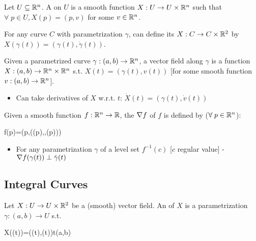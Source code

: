 \documentclass[13pt]{extarticle}
\begin{document}
\newp
\begin{tcolorbox}[colback=white]
    \begin{definition}
        Let $U\subseteq\mathbb{R}^n$. A  on $U$ is a smooth function $X:U\to U\times\mathbb{R}^n$ such that $\forall\;p\in U,X(p)=(p,v)$ for some $v\in\mathbb{R}^n$.
    \end{definition}
\end{tcolorbox}
\begin{note}
    For any curve $C$ with parametrization $\gamma$, can define its  $X:C\to C\times\mathbb{R}^2$ by $X(\gamma(t))=(\gamma(t),\dot\gamma(t))$.
\end{note}

\pstart
\begin{notation}
    Given a parametrized curve $\gamma:(a,b)\to\mathbb{R}^n$, a vector field along $\gamma$ is a function $X:(a,b)\to\mathbb{R}^n\times\mathbb{R}^n$ s.t. $X(t)=(\gamma(t),v(t))$ [for some smooth function $v:(a,b)\to\mathbb{R}^n$]. \begin{itemize}
        \item Can take derivatives of $X$ w.r.t. $t$: $\dot X(t)=(\gamma(t),\dot v(t))$
    \end{itemize}
\end{notation}

\begin{definition}
    Given a smooth function $f:\mathbb{R}^n\to\mathbb{R}$, the  $\nabla f$ of $f$ is defined by ($\forall\;p\in\mathbb{R}^n$): \begin{eqnbox}
        \grad f(p)=\left(p,\left((p),\hdots,(p)\right)\right)
    \end{eqnbox} \begin{itemize}
        \item For any parametrization $\gamma$ of a level set $f^{-1}(c)$ [$c$ regular value] - $\nabla f(\gamma(t))\perp\dot\gamma(t)$
    \end{itemize}
\end{definition}

\newp
\subsection{Integral Curves}
\begin{definition}
    Let $X:U\to U\times\mathbb{R}^2$ be a (smooth) vector field. An  of $X$ is a parametrization $\gamma:(a,b)\to U$ s.t. \begin{eqnbox}
        X(\gamma(t))=(\gamma(t),\dot\gamma(t))\;\forall\;t\in(a,b)
    \end{eqnbox} 
\end{definition}
\end{document}
